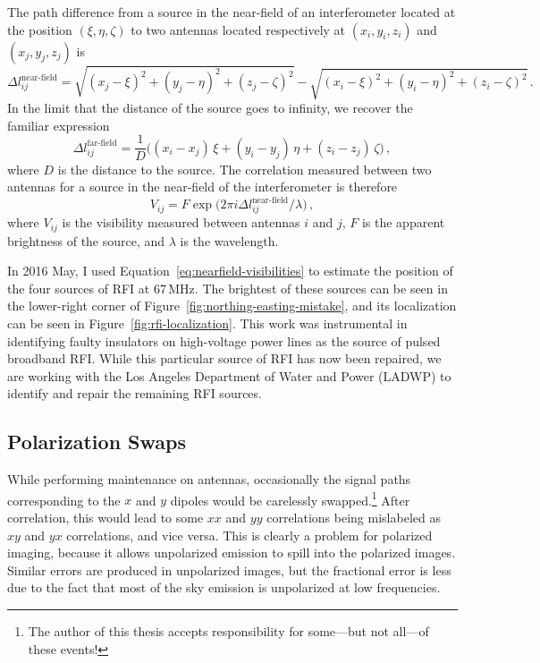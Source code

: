 \begin{bibunit}
The path difference from a source in the near-field of an interferometer located at the position
$(\xi, \eta, \zeta)$ to two antennas located respectively at $(x_i, y_i, z_i)$ and $(x_j, y_j, z_j)$
is
\begin{equation}\label{eq:nearfield-path-difference}
    \Delta l^\text{near-field}_{ij} =
        \sqrt{(x_j - \xi)^2 + (y_j - \eta)^2 + (z_j - \zeta)^2}
        - \sqrt{(x_i - \xi)^2 + (y_i - \eta)^2 + (z_i - \zeta)^2}\,.
\end{equation}
In the limit that the distance of the source goes to infinity, we recover the familiar expression
\begin{equation}\label{eq:farfield-path-difference}
    \Delta l^\text{far-field}_{ij} = \frac{1}{D}\Big(
        (x_i - x_j)\,\xi + (y_i - y_j)\,\eta + (z_i - z_j)\,\zeta
    \Big)\,,
\end{equation}
where $D$ is the distance to the source. The correlation measured between two antennas for a source
in the near-field of the interferometer is therefore
\begin{equation}\label{eq:nearfield-visibilities}
    V_{ij} = F \exp\Big(2\pi i \Delta l^\text{near-field}_{ij}/\lambda\Big)\,,
\end{equation}
where $V_{ij}$ is the visibility measured between antennas $i$ and $j$, $F$ is the apparent
brightness of the source, and $\lambda$ is the wavelength.

In 2016 May, I used Equation~\ref{eq:nearfield-visibilities} to estimate the position of the four
sources of RFI at 67\,MHz. The brightest of these sources can be seen in the lower-right corner of
Figure~\ref{fig:northing-easting-mistake}, and its localization can be seen in
Figure~\ref{fig:rfi-localization}. This work was instrumental in identifying faulty insulators on
high-voltage power lines as the source of pulsed broadband RFI. While this particular source of RFI
has now been repaired, we are working with the Los Angeles Department of Water and Power (LADWP) to
identify and repair the remaining RFI sources.

\subsection{Polarization Swaps}

While performing maintenance on antennas, occasionally the signal paths corresponding to the $x$ and
$y$ dipoles would be carelessly swapped.\footnote{
    The author of this thesis accepts responsibility for some---but not all---of these events!
}
After correlation, this would lead to some $xx$ and $yy$ correlations being mislabeled as $xy$ and
$yx$ correlations, and vice versa. This is clearly a problem for polarized imaging, because it
allows unpolarized emission to spill into the polarized images. Similar errors are produced in
unpolarized images, but the fractional error is less due to the fact that most of the sky emission
is unpolarized at low frequencies.


\end{bibunit}

